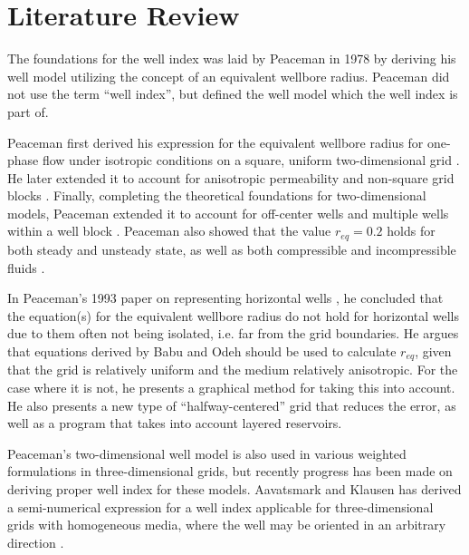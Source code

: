 
\section{Literature Review} %
\label{sec:literature_review}
The foundations for the well index was laid by Peaceman in 1978 \cite{Aavatsmark2003Well} by deriving his well model utilizing the concept of an equivalent wellbore radius. Peaceman did not use the term ``well index'', but defined the well model which the well index is part of.

Peaceman first derived his expression for the equivalent wellbore radius for one-phase flow under isotropic conditions on a square, uniform two-dimensional grid \cite{Peaceman1978Interpretation}. He later extended it to account for anisotropic permeability and non-square grid blocks \cite{Peaceman1983Interpretation}. Finally, completing the theoretical foundations for two-dimensional models, Peaceman extended it to account for off-center wells and multiple wells within a well block \cite{Peaceman1990Interpretation}. Peaceman also showed that the value $r_{eq}=0.2$ holds for both steady and unsteady state, as well as both compressible and incompressible fluids \cite{Peaceman1978Interpretation}.

In Peaceman's 1993 paper on representing horizontal wells \cite{Peaceman1993Representation}, he concluded that the equation(s) for the equivalent wellbore radius do not hold for horizontal wells due to them often not being isolated, i.e. far from the grid boundaries. He argues that equations derived by Babu and Odeh \cite{Babu1991Relation} should be used to calculate $r_{eq}$, given that the grid is relatively uniform and the medium relatively anisotropic. For the case where it is not, he presents a graphical method for taking this into account. He also presents a new type of ``halfway-centered'' grid that reduces the error, as well as a program that takes into account layered reservoirs.

Peaceman's two-dimensional well model is also used in various weighted formulations in three-dimensional grids, but recently progress has been made on deriving proper well index for these models. Aavatsmark and Klausen has derived a semi-numerical expression for a well index applicable for three-dimensional grids with homogeneous media, where the well may be oriented in an arbitrary direction \cite{Aavatsmark2003Well}.

